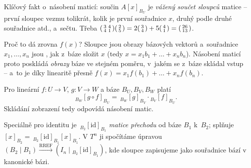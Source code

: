 \documentclass[11pt,a4paper]{article}
\begin{document}
\begin{intuice}
Klíčový fakt o~násobení maticí: součin $A[x]_{B_U}$ je \emph{vážený součet sloupců} matice -- první sloupec vezmu tolikrát, kolik je první souřadnice $x$, druhý podle druhé souřadnice atd., a~sečtu. Třeba $\begin{psmallmatrix}3&4\\4&1\end{psmallmatrix}\begin{psmallmatrix}2\\5\end{psmallmatrix}=2\begin{psmallmatrix}3\\4\end{psmallmatrix}+5\begin{psmallmatrix}4\\1\end{psmallmatrix}=\begin{psmallmatrix}26\\13\end{psmallmatrix}$.

Proč to dá zrovna $f(x)$? Sloupce jsou obrazy bázových vektorů a~souřadnice $x_1,\dots,x_n$ jsou , jak z~báze složit $x$ (tedy $x=x_1b_1+\dots+x_nb_n$). Násobení maticí proto poskládá \emph{obrazy} báze ve stejném poměru, v~jakém se z~báze skládal vstup -- a~to je díky linearitě přesně $f(x)=x_1f(b_1)+\dots+x_nf(b_n)$.
\end{intuice}

\begin{veta}
Pro lineární $f:U\to V$, $g:V\to W$ a báze $B_U,B_V,B_W$ platí
\[
  {}_{B_W}[g\circ f]_{B_U}=\,{}_{B_W}[g]_{B_V}\cdot{}_{B_V}[f]_{B_U}.
\]
Skládání zobrazení tedy odpovídá násobení matic.
\end{veta}

\begin{poznamka}
Speciálně pro identitu je $\,{}_{B_2}[\mathrm{id}]_{B_1}$ \emph{matice přechodu} od báze $B_1$ k~$B_2$; splňuje $[x]_{B_2}=\,{}_{B_2}[\mathrm{id}]_{B_1}[x]_{B_1}$. V $T^n$ ji spočítáme úpravou $(B_2\mid B_1)\xrightarrow{\mathrm{RREF}}(I_n\mid {}_{B_2}[\mathrm{id}]_{B_1})$, kde sloupce zapisujeme jako souřadnice bází v kanonické bázi.
\end{poznamka}

\end{document}
